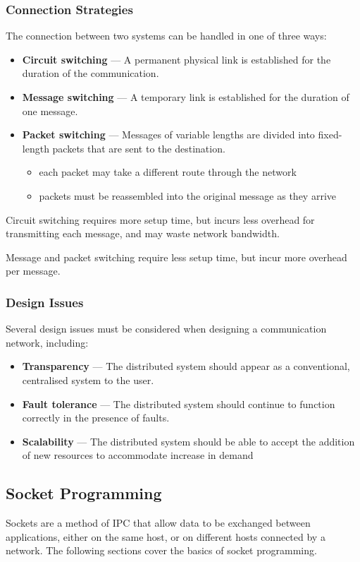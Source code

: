 \documentclass{article}
\begin{document}
\subsubsection{Connection Strategies}
The connection between two systems can be handled in one of three ways:
\begin{itemize}
    \item \textbf{Circuit switching} --- A permanent physical link is
          established for the duration of the communication.
    \item \textbf{Message switching} --- A temporary link is established
          for the duration of one message.
    \item \textbf{Packet switching} --- Messages of variable lengths are
          divided into fixed-length packets that are sent to the
          destination.
          \begin{itemize}
              \item each packet may take a different route through the
                    network
              \item packets must be reassembled into the original
                    message as they arrive
          \end{itemize}
\end{itemize}
Circuit switching requires more setup time, but incurs less overhead for
transmitting each message, and may waste network bandwidth.

Message and packet switching require less setup time, but incur more
overhead per message.
\subsubsection{Design Issues}
Several design issues must be considered when designing a communication
network, including:
\begin{itemize}
    \item \textbf{Transparency} --- The distributed system should appear
          as a conventional, centralised system to the user.
    \item \textbf{Fault tolerance} --- The distributed system should
          continue to function correctly in the presence of faults.
    \item \textbf{Scalability} --- The distributed system should be
          able to accept the addition of new resources to accommodate
          increase in demand
\end{itemize}
\subsection{Socket Programming}
Sockets are a method of IPC that allow data to be exchanged between
applications, either on the same host, or on different hosts connected
by a network. The following sections cover the basics of socket
programming.
\end{document}

